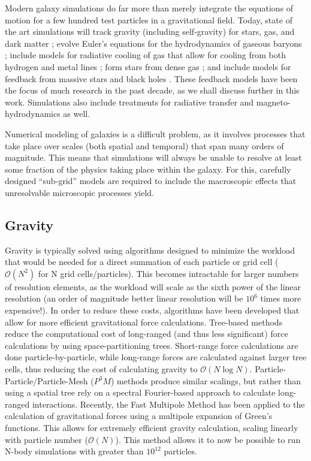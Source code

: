 Modern galaxy simulations do far more than merely integrate the equations of
motion for a few hundred test particles in a gravitational field.  Today, state
of the art simulations will track gravity (including self-gravity) for stars,
gas, and dark matter \citep{Aarseth1980,Stadel2001,Dehnen2002}; evolve Euler's
equations for the hydrodynamics of gaseous baryons
\citep{Wadsley2004,Teyssier2002,Bryan2014}; include models for radiative cooling
of gas that allow for cooling from both hydrogen and metal lines
\citep{Marri2003,Shen2010}; form stars from dense gas
\citep{Katz1992,Agertz2015}; and include models for feedback from massive stars
and black holes \citep{Katz1992,Springel2003,DiMatteo2005}.  These feedback
models have been the focus of much research in the past decade, as we shall
discuss further in this work.  Simulations also include treatments
for radiative transfer \citep{Gendelev2012,Krumholz2013} and
magneto-hydrodynamics \citep{Girichidis2015} as well.

Numerical modeling of galaxies is a difficult problem, as it involves processes
that take place over scales (both spatial and temporal) that span many orders of
magnitude.  This means that simulations will always be unable to resolve at
least some fraction of the physics taking place within the galaxy.  For this,
carefully designed ``sub-grid'' models are required to include the macroscopic
effects that unresolvable microscopic processes yield. 

\subsection{Gravity}
Gravity is typically solved using algorithms designed to minimize the workload
that would be needed for a direct summation of each particle or grid cell
($\mathcal{O}(N^2)$ for N grid cells/particles).  This becomes intractable for
larger numbers of resolution elements, as the workload will scale as the sixth
power of the linear resolution (an order of magnitude better linear resolution
will be $10^6$ times more expensive!).  In order to reduce these costs,
algorithms have been developed that allow for more efficient gravitational
force calculations.  Tree-based methods \citep{Barnes1986} reduce the
computational cost of long-ranged (and thus less significant) force
calculations by using space-partitioning trees.  Short-range force calculations
are done particle-by-particle, while long-range forces are calculated against
larger tree cells, thus reducing the cost of calculating gravity to
$\mathcal{O}(N\log N)$.  Particle-Particle/Particle-Mesh ($P^3M$) methods
\citep{Couchman1991} produce similar scalings, but rather than using a
spatial tree rely on a spectral Fourier-based approach to calculate long-ranged
interactions.  Recently, the Fast Multipole Method \citep{Greengard1987} has
been applied to the calculation of gravitational forces
\citep{Dehnen2002,Hahn2013} using a multipole expansion of Green's functions.
This allows for extremely efficient gravity calculation, scaling linearly with
particle number ($\mathcal{O}(N)$).  This method allows it to now be possible to
run N-body simulations with greater than $10^{12}$ particles\citep{Potter2016}.

